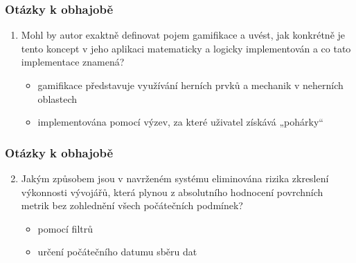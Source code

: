 \documentclass[czech,sage]{ctufit-presentation}
\begin{document}
\begin{frame}
    \frametitle{Otázky k obhajobě}
    \begin{enumerate}
        \item Mohl by autor exaktně definovat pojem gamifikace a uvést, jak konkrétně je tento koncept v jeho aplikaci matematicky a logicky implementován a co tato implementace znamená?
        \begin{itemize}
            \item gamifikace představuje využívání herních prvků a mechanik v neherních oblastech
            \item implementována pomocí výzev, za které uživatel získává „pohárky“
        \end{itemize}
    \end{enumerate}
\end{frame}

\begin{frame}
    \frametitle{Otázky k obhajobě}
    \begin{enumerate}
    \setcounter{enumi}{1}
        \item Jakým způsobem jsou v navrženém systému eliminována rizika zkreslení výkonnosti vývojářů, která plynou z absolutního hodnocení povrchních metrik bez zohlednění všech počátečních podmínek?
        \begin{itemize}
            \item pomocí filtrů
            \item určení počátečního datumu sběru dat
        \end{itemize}
    \end{enumerate}
\end{frame}
\end{document}
